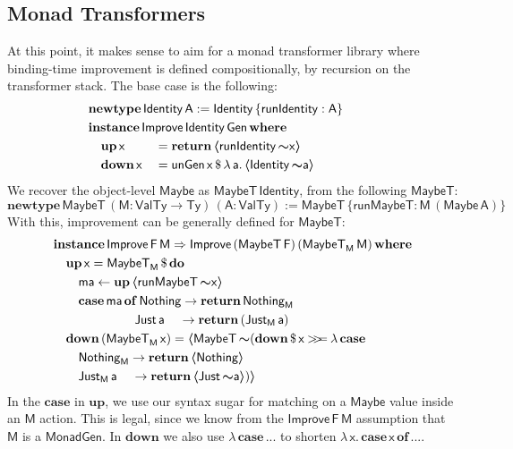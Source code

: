 \documentclass[acmsmall]{acmart}
\newcommand{\mit}[1]{{\mathsf{#1}}}
\newcommand{\msf}[1]{{\mathsf{#1}}}
\newcommand{\mbf}[1]{{\mathbf{#1}}}
\newcommand{\bs}[1]{\boldsymbol{#1}}
\newcommand{\mdo}{\mbf{do}\,}
\newcommand{\ind}{\hspace{1em}}
\newcommand{\return}{\mbf{return}\,}
\newcommand{\lam}{\lambda\,}
\newcommand{\where}{\mbf{where}}
\newcommand{\M}{\msf{M}}
\newcommand{\of}{\mbf{of}\,}
\newcommand{\vma}{\mathsf{ma}}
\newcommand{\vA}{\mathsf{A}}
\newcommand{\vF}{\mathsf{F}}
\newcommand{\vM}{\mathsf{M}}
\newcommand{\va}{\mathsf{a}}
\newcommand{\vx}{\mathsf{x}}
\newcommand{\fro}{\leftarrow}
\newcommand{\case}{\mbf{case\,}}
\newcommand{\spl}{{\bs{\sim}}}
\newcommand{\ql}{{\bs{\langle}}}
\newcommand{\qr}{{\bs{\rangle}}}
\newcommand{\bind}{\mathbin{>\!\!>\mkern-6.7mu=}}
\newcommand{\VTy}{\msf{ValTy}}
\newcommand{\Ty}{\msf{Ty}}
\newcommand{\Maybe}{\msf{Maybe}}
\newcommand{\MaybeT}{\msf{MaybeT}}
\newcommand{\Nothing}{\msf{Nothing}}
\newcommand{\Just}{\msf{Just}}
\theoremstyle{remark}
\newcommand{\mup}{\mbf{up}}
\newcommand{\mdown}{\mbf{down}}
\newcommand{\instance}{\mbf{instance}\,}
\newcommand{\Improve}{\msf{Improve}}
\newcommand{\Gen}{\msf{Gen}}
\newcommand{\unGen}{\mit{unGen}}
\newcommand{\qt}[1]{\ql#1\qr}
\newcommand{\MonadGen}{\msf{MonadGen}}
\newcommand{\RA}{\Rightarrow}
\newcommand{\Identity}{\msf{Identity}}
\newcommand{\runIdentity}{\mit{runIdentity}}
\newcommand{\newtype}{\mbf{newtype}\,}
\newcommand{\runMaybeT}{\mit{runMaybeT}}
\newcommand{\dlr}{\,\$\,}
\begin{document}
\subsection{Monad Transformers}\label{monad-transformers}

At this point, it makes sense to aim for a monad transformer library where
binding-time improvement is defined compositionally, by recursion on the
transformer stack. The base case is the following:
\begin{alignat*}{3}
  & \hspace{-4em}\mathrlap{\newtype \Identity\,\vA := \Identity\,\{\runIdentity : \vA\} }\\
  & \hspace{-4em}\mathrlap{\instance \Improve\,\Identity\,\Gen\,\where}\\
  & \hspace{-4em}\ind \mup\,\vx   &&= \return \qt{\runIdentity\,\spl \vx}\\
  & \hspace{-4em}\ind \mdown\,\vx &&= \unGen\,\vx \dlr \lam \va.\,\qt{\Identity\,\spl \va}
\end{alignat*}
We recover the object-level $\Maybe$ as $\MaybeT\,\Identity$, from the following $\MaybeT$:
\[ \newtype \MaybeT\,(\vM : \VTy \to \Ty)\,(\vA : \VTy) := \MaybeT\,\{\runMaybeT : \vM\,(\Maybe\,\vA)\} \]
With this, improvement can be generally defined for $\MaybeT$:
\begin{alignat*}{3}
  &\instance \Improve\,\vF\,\vM \RA \Improve\,(\MaybeT\,\vF)\,(\MaybeT_\M\,\vM)\,\where\\
  &\ind \mup\,\vx = \MaybeT_\M \dlr \mdo\\
  &\ind\ind \vma \fro \mup\,\qt{\runMaybeT\,\spl \vx}\\
  &\ind\ind \case \vma\,\of \Nothing \to \return \Nothing_\M\\
  &\hspace{6.5em}         \Just\,\va \hspace{1.15em}\to \return (\Just_\M\,\va)\\
  &\ind \mdown\,(\MaybeT_\M\,\vx) = \qt{\MaybeT\,\spl(\mdown \dlr \vx \bind \lam\case\\
  &\ind\ind\Nothing_\M \to \return \qt{\Nothing}\\
  &\ind\ind\Just_\M\,\va\hspace{1.15em} \to \return \qt{\Just\,\spl \va})}
\end{alignat*}
In the $\mbf{case}$ in $\mup$, we use our syntax sugar for matching on a
$\Maybe$ value inside an $\vM$ action. This is legal, since we know from the
$\Improve\,\vF\,\vM$ assumption that $\vM$ is a $\MonadGen$. In $\mdown$ we also use
$\lam\case ...$ to shorten $\lam \vx.\,\case \vx\,\of ...$.
\end{document}
